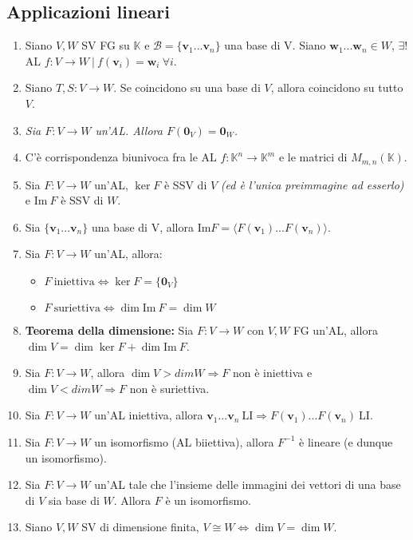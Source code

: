 \documentclass[draft]{article}
\newcommand{\bl}[1]{\mathbf{#1}}
\newcommand{\vv}{\mathbf{v}}
\newcommand{\vw}{\mathbf{w}}
\begin{document}
\subsection{Applicazioni lineari}
\begin{enumerate}

\item Siano $V,W$ SV FG su $\mathbb{K}$ e $\mathcal{B} = \{ \vv _1 ... \vv _n \}$ una base di V. Siano $\vw _1 ... \vw _n \in W$, $\exists !$ AL $f: V \rightarrow W \ | \ f( \vv _i ) = \vw _i \ \forall i$.

\item Siano $T,S: V \rightarrow W$. Se coincidono su una base di $V$, allora coincidono su tutto $V$.

\item \textit{Sia $F:V \rightarrow W$ un'AL. Allora $F(\bl{0}_V ) = \bl{0}_W$.}

\item C'è corrispondenza biunivoca fra le AL $f: \mathbb{K}^n \rightarrow \mathbb{K}^m$ e le matrici di $M_{m,n} (\mathbb{K})$.

\item Sia $F: V \rightarrow W$ un'AL, $\ker F$ è SSV di $V$ \textit{(ed è l'unica preimmagine ad esserlo)} e  $\mathrm{Im} \ F$ è SSV di $W$.

\item Sia $\{ \vv _1 ... \vv _n \}$ una base di V, allora $\mathrm{Im}F=\langle F( \vv _1 ) ... F( \vv _n )\rangle $.

\item Sia $F: V \rightarrow W$ un'AL, allora:
\begin{itemize}
\item $F \ \mathrm{iniettiva} \Leftrightarrow \ker F = \{ \bl{0}_V \}$
\item $F  \ \mathrm{suriettiva} \Leftrightarrow \dim \mathrm{Im}\ F = \dim W$
\end{itemize}

\item \textbf{Teorema della dimensione:} Sia $F: V \rightarrow W$ con $V,W$ FG un'AL, allora $\dim V = \dim \ker F + \dim \mathrm{Im}\ F$. 

\item Sia $F: V \rightarrow W$, allora $\dim V > dim W \Rightarrow F$ non è iniettiva e $\dim V < dim W \Rightarrow F$ non è suriettiva.

\item Sia $F: V \rightarrow W$ un'AL iniettiva, allora $\vv _1 ... \vv _n \ \mathrm{LI} \Rightarrow F( \vv _1 ) ... F( \vv _n ) \ \mathrm{LI} $.

\item Sia $F: V \rightarrow W$ un isomorfismo (AL biiettiva), allora $F^{-1}$ è lineare (e dunque un isomorfismo).

\item Sia $F:V \rightarrow W$ un'AL tale che l'insieme delle immagini dei vettori di una base di $V$ sia base di $W$. Allora $F$ è un isomorfismo.

\item Siano $V, W$ SV di dimensione finita, $V \cong W \Leftrightarrow \dim V = \dim W$.
\end{enumerate}
\end{document}
